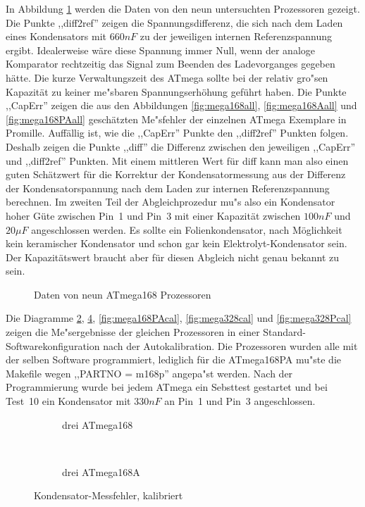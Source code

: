In Abbildung \ref{fig:CompAdjust} werden die Daten von den neun untersuchten Prozessoren gezeigt.
Die Punkte ,,diff2ref'' zeigen die Spannungsdifferenz, die sich nach dem Laden eines Kondensators mit \(660 nF\) zu der
jeweiligen internen Referenzspannung ergibt. Idealerweise w\"are diese Spannung immer Null, wenn der analoge
Komparator rechtzeitig das Signal zum Beenden des Ladevorganges gegeben h\"atte. Die kurze Verwaltungszeit des ATmega
sollte bei der relativ gro"sen Kapazit\"at zu keiner me"sbaren Spannungserh\"ohung gef\"uhrt haben.
Die Punkte ,,CapErr'' zeigen die aus den Abbildungen \ref{fig:mega168all}, \ref{fig:mega168Aall} und \ref{fig:mega168PAall} 
gesch\"atzten Me"sfehler der einzelnen ATmega Exemplare in Promille.
Auff\"allig ist, wie die ,,CapErr'' Punkte den ,,diff2ref'' Punkten folgen.
Deshalb zeigen die Punkte ,,diff'' die Differenz zwischen den jeweiligen ,,CapErr'' und ,,diff2ref'' Punkten.
Mit einem mittleren Wert f\"ur diff kann man also einen guten Sch\"atzwert f\"ur die Korrektur der Kondensatormessung aus der
Differenz der Kondensatorspannung nach dem Laden zur internen Referenzspannung berechnen.
Im zweiten Teil der Abgleichprozedur mu"s also ein Kondensator hoher G\"ute zwischen Pin~1 und Pin~3 mit einer
Kapazit\"at zwischen \(100 nF\) und \(20 \mu F\) angeschlossen werden. 
Es sollte ein Folienkondensator, nach M\"oglichkeit kein keramischer Kondensator und schon gar kein
Elektrolyt-Kondensator sein. Der Kapazit\"atswert braucht aber f\"ur diesen Abgleich nicht genau bekannt zu sein.

\begin{figure}[H]
\centering

\caption{Daten von neun ATmega168 Prozessoren}
\label{fig:CompAdjust}
\end{figure}

Die Diagramme \ref{fig:mega168cal}, \ref{fig:mega168Acal}, \ref{fig:mega168PAcal},  \ref{fig:mega328cal} und
\ref{fig:mega328Pcal} zeigen die Me"sergebnisse
der gleichen Prozessoren in einer Standard-Softwarekonfiguration nach der Autokalibration.
Die Prozessoren wurden alle mit der selben Software programmiert, lediglich f\"ur die ATmega168PA mu"ste die
Makefile wegen ,,PARTNO = m168p'' angepa"st werden. Nach der Programmierung wurde bei jedem ATmega ein
Sebsttest gestartet und bei Test~10 ein Kondensator mit \(330 nF\) an Pin~1 und Pin~3 angeschlossen.

\begin{figure}[H]
  \begin{subfigure}[b]{9cm}
    \centering
    \resizebox{9cm}{!}{}
    \caption{drei ATmega168}
    \label{fig:mega168cal}
  \end{subfigure}
  ~
  \begin{subfigure}[b]{9cm}
    \centering
    \resizebox{9cm}{!}{}
    \caption{drei ATmega168A}
    \label{fig:mega168Acal}
  \end{subfigure}
  \caption{Kondensator-Messfehler, kalibriert}
\end{figure}

